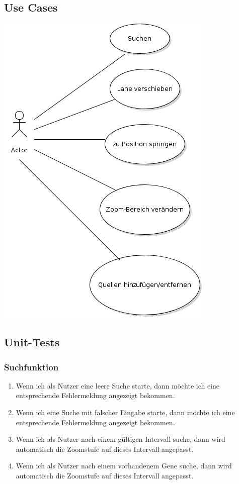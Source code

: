 \subsection{Use Cases}
\includegraphics[width=\textwidth]{gui/gui-usecasediagramm.png}
\subsection{Unit-Tests}
\subsubsection{Suchfunktion}
\begin{enumerate}
	\item Wenn ich als Nutzer eine leere Suche starte, dann möchte ich eine entsprechende Fehlermeldung angezeigt bekommen.
	\item Wenn ich eine Suche mit falscher Eingabe starte, dann möchte ich eine entsprechende Fehlermeldung angezeigt bekommen.
	\item Wenn ich als Nutzer nach einem gültigen Intervall suche, dann wird automatisch die Zoomstufe auf dieses Intervall angepasst.
	\item Wenn ich als Nutzer nach einem vorhandenem Gene suche, dann wird automatisch die Zoomstufe auf dieses Intervall angepasst.
\end{enumerate}


